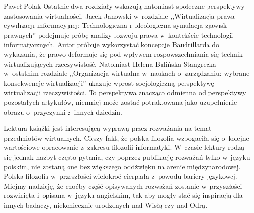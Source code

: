 \begin{recplenv}{Paweł Polak}
Ostatnie dwa rozdziały wskazują natomiast społeczne perspektywy zastosowania wirtualności. Jacek Janowski w~rozdziale ,,Wirtualizacja prawa cywilizacji informacyjnej: Technologiczna i~ideologiczna symulacja zjawisk prawnych'' podejmuje próbę analizy rozwoju prawa w~kontekście technologii informatycznych. Autor próbuje wykorzystać koncepcje Baudrillarda do wykazania, że prawo deformuje się pod wpływem rozpowszechniania się technik wirtualizujących rzeczywistość. Natomiast Helena Bulińska-Stangrecka w~ostatnim rozdziale ,,Organizacja wirtualna w~naukach o~zarządzaniu: wybrane konsekwencje wirtualizacji'' ukazuje wprost socjologiczną perspektywę wirtualizacji rzeczywistości. To perspektywa znacząco odmienna od perspektywy pozostałych artykułów, niemniej może zostać potraktowana jako uzupełnienie obrazu o~przyczynki z~innych dziedzin.

Lektura książki jest interesującą wyprawą przez rozważania na temat przedmiotów wirtualnych. Cieszy fakt, że polska filozofia wzbogaciła się o~kolejne wartościowe opracowanie z~zakresu filozofii informatyki. W~czasie lektury rodzą się jednak nazbyt często pytania, czy poprzez publikację rozważań tylko w~języku polskim, nie zostaną one bez większego oddźwięku na arenie międzynarodowej. Polska filozofia w~przeszłości wielokroć cierpiała z~powodu bariery językowej. Miejmy nadzieję, że choćby część opisywanych rozważań zostanie w~przyszłości rozwinięta i~opisana w~języku angielskim, tak aby mogły stać się inspiracją dla innych badaczy, niekoniecznie urodzonych nad Wisłą czy nad Odrą.

\nocite{stacewicz_przedmioty_2019}





\end{recplenv}